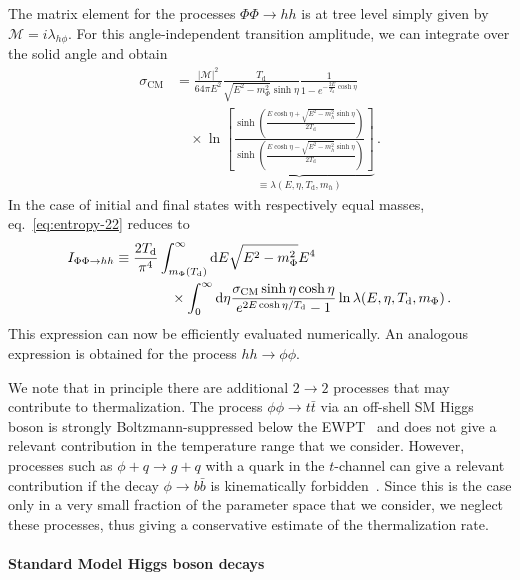 The matrix element for the processes $\Phi\Phi\to hh$ is at tree level simply given by $\mathcal{M} = i\lambda_{h\phi}$. For this angle-independent transition amplitude, we can integrate over the solid angle and obtain
\begin{align}
	\sigma_{\mathrm{CM}} &= \frac{|\mathcal{M}|^2}{64\pi E^2} \frac{T_\text{d}}{\sqrt{E^2-m_{\Phi}^2} \sinh{\eta}}
	\frac{1}{1-e^{- \frac{2E}{T_\text{d}}\cosh\eta}} \nonumber \\ & \quad \times  \ln \underbrace{\left[ \frac{\sinh \left( \frac{E\cosh\eta +
				\sqrt{E^2-m_{h}^2}\sinh\eta}{2T_\text{d}} \right)}{\sinh \left( \frac{E\cosh\eta -
				\sqrt{E^2-m_{h}^2}\sinh\eta}{2T_\text{d}} \right)} \right]}_{\equiv \lambda(E, \eta, T_\text{d}, m_{h})} \, .
\end{align}
In the case of initial and final states with respectively equal masses, eq.~\eqref{eq:entropy-22} reduces to
\begin{align}
	I_{\Phi\Phi \rightarrow h h}  &\equiv \frac{2T_{\mathrm{d}}}{\pi^4} \int_{m_{\Phi}(T_\text{d})}^{\infty}\diff E \sqrt{E^2-m_{\Phi}^2}E^4  \nonumber \\ & \qquad \qquad \times 
	\int_{0}^{\infty}\diff \eta \frac{\sigma_{\mathrm{CM}}  \sinh\eta\cosh\eta}{e^{2E\cosh\eta/T_{\mathrm{d}}}-1}
	\ln \lambda(E, \eta, T_\mathrm{d}, m_{\Phi}) \, .%
\end{align}
This expression can now be efficiently evaluated numerically. An analogous expression is obtained for the process $h h \rightarrow \phi \phi$.

We note that in principle there are additional $2 \to 2$ processes that may contribute to thermalization. The process $\phi \phi \to t \bar{t}$ via an off-shell SM Higgs boson is strongly Boltzmann-suppressed below the \ac{EWPT}~\cite{Bringmann:2021sth} and does not give a relevant contribution in the temperature range that  we consider. However, processes such as $\phi + q \to g + q$ with a quark in the $t$-channel can give a relevant contribution if the decay $\phi \to b \bar{b}$ is kinematically forbidden~\cite{Evans:2017kti,Fradette:2018hhl}. Since this is the case only in a very small fraction of the parameter space that we consider, we neglect these processes, thus giving a conservative estimate of the thermalization rate.

\paragraph{Standard Model Higgs boson decays}
\label{app:inverse-SM-Higgs-decays}

